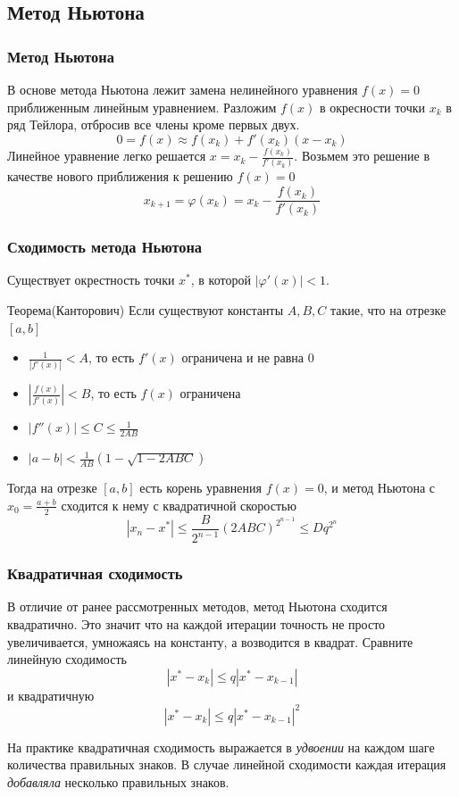 \documentclass[apectratio=43,unicode]{beamer}
\begin{document}
\subsection{Метод Ньютона}
\begin{frame}
\frametitle{Метод Ньютона}
	В основе метода Ньютона лежит замена нелинейного уравнения $f(x) = 0$ приближенным линейным уравнением.
	Разложим $f(x)$ в окресности точки $x_k$ в ряд Тейлора, отбросив все члены кроме первых двух.
	\[
	0 = f(x) \approx f(x_k) + f'(x_k)(x - x_k)
	\]
	Линейное уравнение легко решается $x = x_k - \frac{f(x_k)}{f'(x_k)}$. Возьмем это решение в качестве нового приближения к решению $f(x) = 0$
	\[
	x_{k+1} = \varphi(x_k) = x_k - \frac{f(x_k)}{f'(x_k)}
	\]
\end{frame}

\begin{frame}
\frametitle{Сходимость метода Ньютона}
	Существует окрестность точки $x^*$, в которой $|\varphi'(x)| < 1$.
	\begin{block}{Теорема(Канторович)}
		Если существуют константы $A,B,C$ такие, что на отрезке $[a,b]$
		\begin{itemize}
			\item $\frac{1}{|f'(x)|} < A$, то есть $f'(x)$ ограничена и не равна $0$
			\item $|\frac{f(x)}{f'(x)}| < B$, то есть $f(x)$ ограничена
			\item $|f''(x)| \leq C \leq \frac{1}{2AB}$
			\item $|a-b| < \frac{1}{AB}\left(1-\sqrt{1-2ABC}\right)$
		\end{itemize}
		Тогда на отрезке $[a,b]$ есть корень уравнения $f(x) = 0$, и метод Ньютона с $x_0 = \frac{a+b}{2}$ сходится к нему с квадратичной скоростью
		\[
		|x_n - x^*| \leq \frac{B}{2^{n-1}} (2ABC)^{2^{n-1}} \leq D q^{2^n}
		\]
	\end{block}
\end{frame}

\begin{frame}
\frametitle{Квадратичная сходимость}
	В отличие от ранее рассмотренных методов, метод Ньютона сходится квадратично. Это значит что на каждой итерации точность не просто увеличивается, умножаясь на константу,
	а возводится в квадрат.
	Сравните линейную сходимость
	\[
	|x^* - x_k| \leq q |x^* - x_{k-1}|
	\]
	и квадратичную
	\[
	|x^* - x_k| \leq q |x^* - x_{k-1}|^2
	\]

	На практике квадратичная сходимость выражается в \emph{удвоении} на каждом шаге количества правильных знаков.
	В случае линейной сходимости каждая итерация \emph{добавляла} несколько правильных знаков.
\end{frame}
\end{document}
